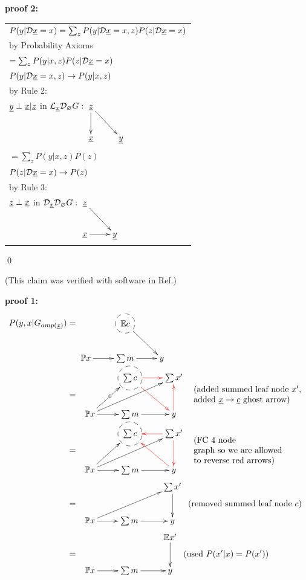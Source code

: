 {\bf * proof 2:}
\begin{longtable}{l}
\color{red}
$P(y|\cald\rvx=x)
=
\sum_z
P(y|\cald\rvx=x, z)
P(z|\cald\rvx=x)$
\\
\quad by Probability Axioms
\\
\color{red}
$=\sum_z
P(y|x, z)
P(z|\cald\rvx=x)$
\\
\quad $P(y|\cald \rvx=x, z)\rarrow
P(y|x, z)$
\\
\quad  by Rule 2:
\\
\quad
$\rvy\perp\rvx|\rvz$ in
$\call_\rvx\cald_\eset G:
\xymatrix{
\rvz\ar[d]\ar[rd]
\\
\rvx
&\rvy
}$
\\
\color{red}
$=\sum_z
P(y|x, z)
P(z)$
\\
\quad $P(z|\cald \rvx=x)\rarrow
P(z)$
\\
\quad  by Rule 3:
\\
\quad
$\rvz\perp \rvx$ in
$\cald_\rvx \cald_\eset G:
\xymatrix{
\rvz\ar[rd]
\\
\rvx\ar[r]
&\rvy
}
$
\end{longtable}
\qed




\begin{claim}
\label{cl-decFrontDoor}
\decFrontDoor
\end{claim}

\proof
(This claim was verified with software in 
Ref.\cite{dag-iden-detector})


{\bf * proof 1:}

\begin{align}
P(y, x |G_{amp(\rvx)})&=
\xymatrix{
&*++[F-o]{\EE c}\ar[rd]
\\
\PP x\ar[r]
&\sum m\ar[r]&y
}
\\
&=
\bcen
\xymatrix{
&*++[F-o]{\sum c}\ar@[red][rd]
\ar@[red][r]
\ar@{<-}[dl]|0
& \sum x'
\\
\PP x\ar[r]
\ar[rru]
&\sum m\ar[r]
&y\ar@[red][u]
}
\ecen
\begin{array}{l}
\text{(added summed leaf node $x'$,}
\\
\text{added $\rvx\to \rvc$
ghost arrow)}
\end{array}
\\
&=
\bcen
\xymatrix{
&*++[F-o]{\sum c}\ar@{<-}@[red][rd]
\ar@{<-}@[red][r]
\ar@{<-}[dl]
& \sum x'
\\
\PP x\ar[r]
\ar[rru]
&\sum m\ar[r]
&y\ar@[red]@{<-}[u]
}
\ecen
\begin{array}{l}
\text{(FC 4 node}
\\
\text{graph so we are allowed} 
\\
\text{to reverse red arrows)}
\end{array}
\\
&=
\bcen
\xymatrix{
& &\sum x'\ar[d]
\\
\PP x\ar[r]\ar[rru]
&\sum m\ar[r]
&y
}
\ecen
\text{(removed summed leaf node $c$)}
\\
&=
\bcen
\xymatrix{
& &\EE x'\ar[d]
\\
\PP x\ar[r]
&\sum m\ar[r]
&y
}
\ecen
\text{(used $P(x'|x)=P(x')$)}
\end{align}


